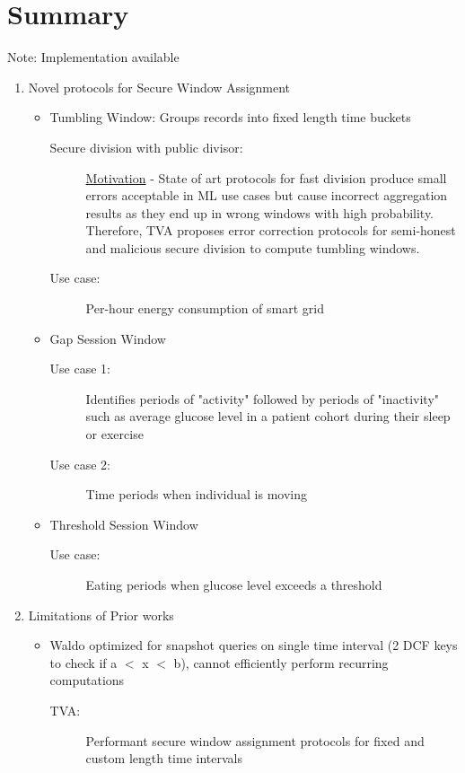 \section{Summary}
Note: Implementation available
\begin{enumerate}
   \item Novel protocols for Secure Window Assignment
   \begin{itemize}
     \item Tumbling Window: Groups records into fixed length time buckets
     \begin{description}
     \item[Secure division with public divisor:] \underline{Motivation} - State of art protocols for fast division produce small errors acceptable in ML use cases but cause incorrect aggregation results as they end up in wrong windows with high probability. Therefore, TVA proposes error correction protocols for semi-honest and malicious secure division to compute tumbling windows. 
     \item[Use case:] Per-hour energy consumption of smart grid
     \end{description}
     \item Gap Session Window 
    \begin{description}
     \item[Use case 1:] Identifies periods of "activity" followed by periods of "inactivity" such as average glucose level in a patient cohort during their sleep or exercise
     \item[Use case 2:] Time periods when individual is moving
     \end{description} 
     \item Threshold Session Window
     \begin{description}
     \item[Use case:] Eating periods when glucose level exceeds a threshold 
     \end{description}
   \end{itemize}
    \item Limitations of Prior works
    \begin{itemize}
       \item Waldo optimized for snapshot queries on single time interval (2 DCF keys to check if a $<$ x $<$ b), cannot efficiently perform recurring computations
        \begin{description}
            \item[TVA:] Performant secure window assignment protocols for fixed and custom length time intervals

\end{description}
\end{itemize}
\end{enumerate}
